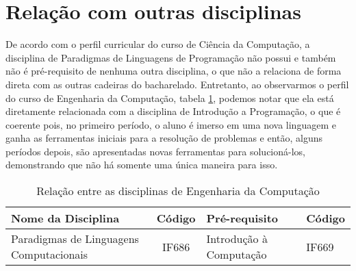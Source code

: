 \documentclass[10pt]{article}
\begin{document}
\section{Relação com outras disciplinas}
\justify
De acordo com o perfil curricular do curso de Ciência da Computação, a disciplina de Paradigmas de Linguagens de Programação não possui e também não é pré-requisito de nenhuma outra disciplina, o que não a relaciona de forma direta com as outras cadeiras do bacharelado. Entretanto, ao observarmos o perfil do curso de Engenharia da Computação, tabela \ref{tab:relacaoDisciplinas}, podemos notar que ela está diretamente relacionada com a disciplina de Introdução a Programação, o que é coerente pois, no primeiro período, o aluno é imerso em uma nova linguagem e ganha as ferramentas iniciais para a resolução de problemas e então, alguns períodos depois, são apresentadas novas ferramentas para solucioná-los, demonstrando que não há somente uma única maneira para isso.

\begin{table}[h]
\centering
\begin{tabular}{p{3.5cm}|c|p{2.5cm}|l}
Nome da Disciplina & Código & Pré-requisito & Código\\
\hline\hline
Paradigmas de Linguagens Computacionais & IF686 & Introdução à Computação & IF669
\end{tabular}
\caption{Relação entre as disciplinas de Engenharia da Computação}
\label{tab:relacaoDisciplinas}
\end{table}



\end{document}
